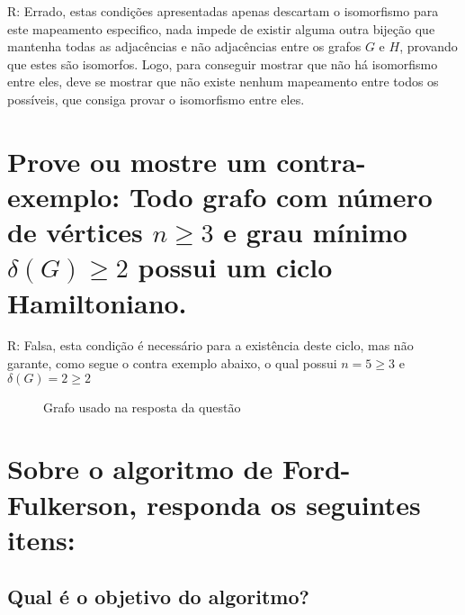 \documentclass[final,3p,12pt]{elsarticle}
\begin{document}
		R: Errado, estas condições apresentadas apenas descartam o isomorfismo para este mapeamento especifico, nada impede de existir alguma outra bijeção que mantenha todas as adjacências e não adjacências entre os grafos $G$ e $H$, provando que estes são isomorfos. Logo, para conseguir mostrar que não há isomorfismo entre eles, deve se mostrar que não existe nenhum mapeamento entre todos os possíveis, que consiga provar o isomorfismo entre eles.

\section{Prove ou mostre um contra-exemplo: Todo grafo com número de vértices $n \geq 3$ e grau mínimo $\delta(G) \geq 2$ possui um ciclo Hamiltoniano.}
	\label{S:3}

		R: Falsa, esta condição é necessário para a existência deste ciclo, mas não garante, como segue o contra exemplo abaixo, o qual possui $n = 5 \geq 3$ e $\delta(G) = 2 \geq 2$

		\begin{figure}[!ht]
			\centering
			\caption{Grafo usado na resposta da questão \thesection}
		\end{figure}

\section{Sobre o algoritmo de Ford-Fulkerson, responda os seguintes itens:}
	\label{S:4}
		\subsection{Qual é o objetivo do algoritmo?}
			
\end{document}
